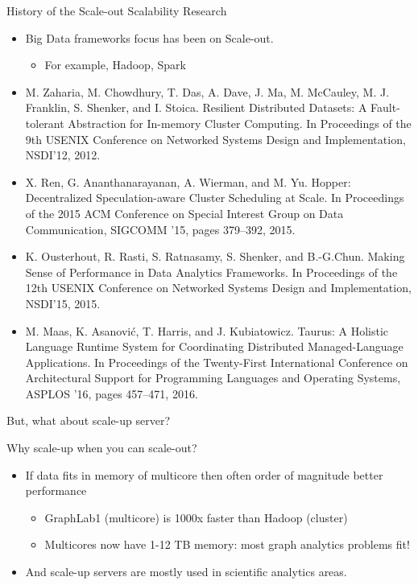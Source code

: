 \documentclass[english]{beamer} %
\begin{document}
\begin{frame}{History of the Scale-out Scalability Research}
    \begin{itemize}
    \item Big Data frameworks focus has been on Scale-out.
        \begin{itemize}
            \item For example, Hadoop, Spark 
        \end{itemize}
    \item \tiny{M. Zaharia, M. Chowdhury, T. Das, A. Dave, J. Ma, M. McCauley,
    M. J.
    Franklin, S. Shenker, and I. Stoica.
    Resilient Distributed Datasets: A Fault-tolerant Abstraction for In-memory
    Cluster Computing. In Proceedings of the 9th USENIX Conference on Networked
    Systems Design and Implementation, NSDI’12, 2012.}
    \item X. Ren, G. Ananthanarayanan, A. Wierman, and M. Yu. Hopper:
     Decentralized Speculation-aware Cluster Scheduling at Scale. In Proceedings
    of the 2015 ACM Conference on Special Interest Group on Data Communication,
    SIGCOMM ’15, pages 379–392, 2015.
    \item K. Ousterhout, R. Rasti, S. Ratnasamy, S. Shenker, and B.-G.Chun.
    Making Sense of Performance in Data Analytics Frameworks. In Proceedings of the
    12th USENIX Conference on Networked Systems Design and Implementation,
    NSDI’15, 2015.
    \item M. Maas, K. Asanović, T. Harris, and J. Kubiatowicz. Taurus: A
    Holistic Language Runtime System for Coordinating Distributed Managed-Language
    Applications. In Proceedings of the Twenty-First International Conference on
    Architectural Support for Programming Languages and Operating Systems,
    ASPLOS ’16, pages 457–471, 2016.
    \end{itemize}
\end{frame}

\begin{frame}{But, what about scale-up server?}
\end{frame}

\begin{frame}{Why scale-up when you can scale-out?}
    \begin{itemize}
    \item If data fits in memory of multicore then often order of magnitude
    better performance
        \begin{itemize}
            \item GraphLab1 (multicore) is 1000x faster than Hadoop (cluster)
            \item Multicores now have 1-12 TB memory: most graph analytics
            problems fit!
        \end{itemize}
    \item And scale-up servers are mostly used in scientific analytics areas.
    \end{itemize}
\end{frame}
\end{document}
